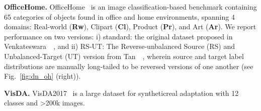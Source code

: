 \documentclass[10pt,twocolumn,letterpaper]{article}
\begin{document}
\par\noindent\textbf{OfficeHome.} OfficeHome~\cite{venkateswara2017deep} is an image classification-based benchmark containing 65 categories of objects found in office and home environments, spanning 4 domains: Real-world (\textbf{Rw}), Clipart (\textbf{Cl}), Product (\textbf{Pr}), and Art (\textbf{Ar}). We report performance on two versions: i) standard: the original dataset proposed in Venkateswara~\etal~\cite{venkateswara2017deep}, and ii) RS-UT: The Reverse-unbalanced Source (RS) and Unbalanced-Target (UT) version from Tan~\etal~\cite{tan2019generalized}, wherein source and target label distributions are manually long-tailed to be reversed versions of one another (see Fig.~\ref{fig:dn_oh} (right)).

\par\noindent\textbf{VisDA.} VisDA2017~\cite{peng2017visda} is a large dataset for syntheticreal adaptation with 12 classes and >200k images.
\end{document}
